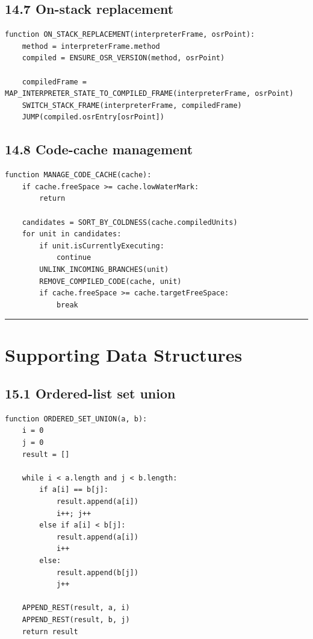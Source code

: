 \documentclass[10pt,letterpaper]{article}
\begin{document}
\subsection*{14.7 On-stack replacement}
{}

\begin{verbatim}
function ON_STACK_REPLACEMENT(interpreterFrame, osrPoint):
    method = interpreterFrame.method
    compiled = ENSURE_OSR_VERSION(method, osrPoint)

    compiledFrame = MAP_INTERPRETER_STATE_TO_COMPILED_FRAME(interpreterFrame, osrPoint)
    SWITCH_STACK_FRAME(interpreterFrame, compiledFrame)
    JUMP(compiled.osrEntry[osrPoint])
\end{verbatim}

\subsection*{14.8 Code-cache management}
{}

\begin{verbatim}
function MANAGE_CODE_CACHE(cache):
    if cache.freeSpace >= cache.lowWaterMark:
        return

    candidates = SORT_BY_COLDNESS(cache.compiledUnits)
    for unit in candidates:
        if unit.isCurrentlyExecuting:
            continue
        UNLINK_INCOMING_BRANCHES(unit)
        REMOVE_COMPILED_CODE(cache, unit)
        if cache.freeSpace >= cache.targetFreeSpace:
            break
\end{verbatim}

\medskip\hrule\medskip

\clearpage
\section{Supporting Data Structures}

\subsection*{15.1 Ordered-list set union}
{}

\begin{verbatim}
function ORDERED_SET_UNION(a, b):
    i = 0
    j = 0
    result = []

    while i < a.length and j < b.length:
        if a[i] == b[j]:
            result.append(a[i])
            i++; j++
        else if a[i] < b[j]:
            result.append(a[i])
            i++
        else:
            result.append(b[j])
            j++

    APPEND_REST(result, a, i)
    APPEND_REST(result, b, j)
    return result
\end{verbatim}
\end{document}
